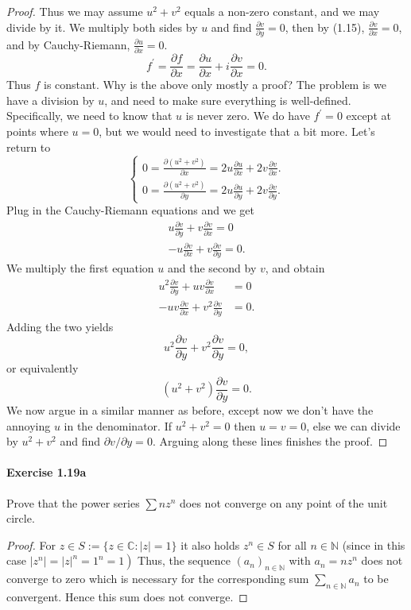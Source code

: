 \documentclass{article}
\begin{document}
\begin{proof}
Thus we may assume $u^2+v^2$ equals a non-zero constant, and we may divide by it. We multiply both sides by $u$ and find $\frac{\partial v}{\partial y}=0$, then by (1.15), $\frac{\partial v}{\partial x}=0$, and by Cauchy-Riemann, $\frac{\partial u}{\partial x}=0$.
$$
f^{\prime}=\frac{\partial f}{\partial x}=\frac{\partial u}{\partial x}+i \frac{\partial v}{\partial x}=0 .
$$
Thus $f$ is constant.
Why is the above only mostly a proof? The problem is we have a division by $u$, and need to make sure everything is well-defined. Specifically, we need to know that $u$ is never zero. We do have $f^{\prime}=0$ except at points where $u=0$, but we would need to investigate that a bit more.
Let's return to
$$
\left\{\begin{array}{l}
0=\frac{\partial\left(u^2+v^2\right)}{\partial x}=2 u \frac{\partial u}{\partial x}+2 v \frac{\partial v}{\partial x} . \\
0=\frac{\partial\left(u^2+v^2\right)}{\partial y}=2 u \frac{\partial u}{\partial y}+2 v \frac{\partial v}{\partial y} .
\end{array}\right.
$$
Plug in the Cauchy-Riemann equations and we get
$$
\begin{array}{r}
u \frac{\partial v}{\partial y}+v \frac{\partial v}{\partial x}=0 \\
-u \frac{\partial v}{\partial x}+v \frac{\partial v}{\partial y}=0 .
\end{array}
$$
We multiply the first equation $u$ and the second by $v$, and obtain
$$
\begin{aligned}
u^2 \frac{\partial v}{\partial y}+u v \frac{\partial v}{\partial x} & =0 \\
-u v \frac{\partial v}{\partial x}+v^2 \frac{\partial v}{\partial y} & =0 .
\end{aligned}
$$
Adding the two yields
$$
u^2 \frac{\partial v}{\partial y}+v^2 \frac{\partial v}{\partial y}=0,
$$
or equivalently
$$
\left(u^2+v^2\right) \frac{\partial v}{\partial y}=0 .
$$
We now argue in a similar manner as before, except now we don't have the annoying $u$ in the denominator. If $u^2+v^2=0$ then $u=v=0$, else we can divide by $u^2+v^2$ and find $\partial v / \partial y=0$. Arguing along these lines finishes the proof.
\end{proof}



\paragraph{Exercise 1.19a} Prove that the power series $\sum nz^n$ does not converge on any point of the unit circle.
\begin{proof}
    For $z \in S:=\{z \in \mathbb{C}:|z|=1\}$ it also holds $z^n \in S$ for all $n \in \mathbb{N}$ (since in this case $\left.\left|z^n\right|=|z|^n=1^n=1\right)$
Thus, the sequence $\left(a_n\right)_{n \in \mathbb{N}}$ with $a_n=n z^n$ does not converge to zero which is necessary for the corresponding sum $\sum_{n \in \mathbb{N}} a_n$ to be convergent. Hence this sum does not converge.
\end{proof}
\end{document}
